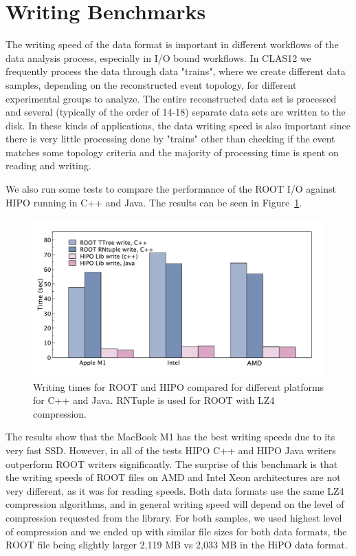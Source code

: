 \documentclass[preprint,12pt]{elsarticle}
\begin{document}
 \section{Writing Benchmarks}

The writing speed of the data format is important in different workflows of the data analysis process, especially in I/O bound workflows.
In CLAS12 we frequently process the data through data "trains", where we create different data samples, depending on the reconstructed event topology,
for different experimental groups to analyze. The entire reconstructed data set is processed and several (typically of the order of 14-18) separate data sets 
are written to the disk. In these kinds of applications, the data writing speed is also important since there is very little processing done by "trains" other
than checking if the event matches some topology criteria and the majority of processing time is spent on reading and writing.

We also run some tests to compare the performance of the ROOT I/O against HIPO running in C++ and Java. The results can be 
seen in Figure~\ref{benchmark:write}.

  \begin{figure}[!h]
\begin{center}
  \includegraphics[width=5.0in]{bench_root_vs_hipo_write.pdf}
 \caption { Writing times for ROOT and HIPO compared for different platforms for C++ and Java. RNTuple is used for ROOT with LZ4 compression.}
 \label{benchmark:write}
 \end{center}
  \end{figure}
  
The results show that the MacBook M1 has the best writing speeds due to its very fast SSD. However, in all of the tests
HIPO C++ and HIPO Java writers outperform ROOT writers significantly. The surprise of this benchmark is that the writing 
speeds of ROOT files on AMD and Intel Xeon architectures are not very different, as it was for reading speeds.
Both data formats use the same LZ4 compression algorithms, and in general writing speed will depend on the level of compression requested from the library. For both samples, we used highest level of compression and we ended up with similar file sizes for both data formats, the ROOT file being slightly larger 2,119 MB vs 2,033 MB in the HiPO data format. 
\end{document}
